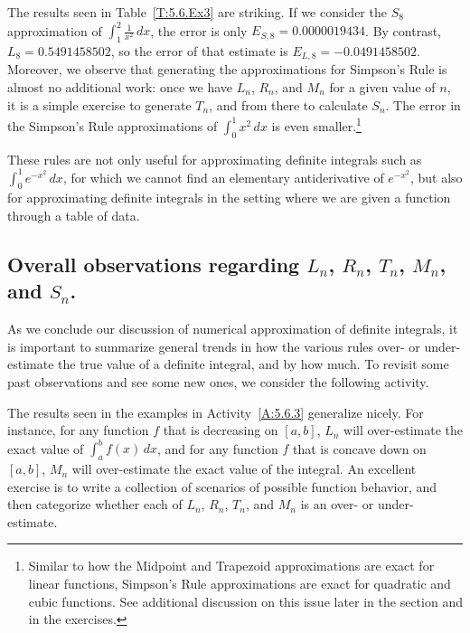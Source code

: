 The results seen in Table~\ref{T:5.6.Ex3} are striking.  If we consider the $S_8$ approximation of $\int_1^2 \frac{1}{x^2} \, dx$, the error is only $E_{S,8} = 0.0000019434$.  By contrast, $L_8 = 0.5491458502$, so the error of that estimate is $E_{L,8} = -0.0491458502$.  Moreover, we observe that generating the approximations for Simpson's Rule is almost no additional work:  once we have $L_n$, $R_n$, and $M_n$ for a given value of $n$, it is a simple exercise to generate $T_n$, and from there to calculate $S_n$.  The error in the Simpson's Rule approximations of $\int_0^1 x^2 \, dx$ is even smaller.\footnote{Similar to how the Midpoint and Trapezoid approximations are exact for linear functions, Simpson's Rule approximations are exact for quadratic and cubic functions.  See additional discussion on this issue later in the section and in the exercises.}

These rules are not only useful for approximating definite integrals such as $\int_0^1 e^{-x^2} \, dx$, for which we cannot find an elementary antiderivative of $e^{-x^2}$, but also for approximating definite integrals in the setting where we are given a function through a table of data.



\subsection*{Overall observations regarding $L_n$, $R_n$, $T_n$, $M_n$, and $S_n$.}

As we conclude our discussion of numerical approximation of definite integrals, it is important to summarize general trends in how the various rules over- or under-estimate the true value of a definite integral, and by how much.  To revisit some past observations and see some new ones, we consider the following activity.



The results seen in the examples in Activity~\ref{A:5.6.3} generalize nicely.  For instance, for any function $f$ that is decreasing on $[a,b]$, $L_n$ will over-estimate the exact value of $\int_a^b f(x) \,dx$, and for any function $f$ that is concave down on $[a,b]$, $M_n$ will over-estimate the exact value of the integral.  An excellent exercise is to write a collection of scenarios of possible function behavior, and then categorize whether each of $L_n$, $R_n$, $T_n$, and $M_n$ is an over- or under-estimate.

